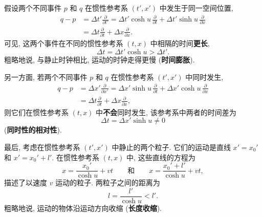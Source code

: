 假设两个不同事件 $p$ 和 $q$ 在惯性参考系 $(t',x')$ 中发生于同一空间位置,
\begin{align*}
  q-p&=\Delta t'\frac{\partial}{\partial t'}
      =\Delta t'\cosh u\,\frac{\partial}{\partial t}
        +\Delta t'\sinh u\,\frac{\partial}{\partial x}\\
     &=\Delta t\frac{\partial}{\partial t}+\Delta x\frac{\partial}{\partial x}.
\end{align*}
可见, 这两个事件在不同的惯性参考系 $(t,x)$ 中相隔的时间\textbf{更长},
\[
  \Delta t=\Delta t'\cosh u>\Delta t'.
\]
粗略地说, 与静止时钟相比, 运动的时钟走得更慢 (\textbf{时间膨胀}).

另一方面, 若两个不同事件 $p$ 和 $q$ 在惯性参考系 $(t',x')$ 中同时发生,
\begin{align*}
  q-p&=\Delta x'\frac{\partial}{\partial x'}
      =\Delta x'\sinh u\,\frac{\partial}{\partial t}
        +\Delta x'\cosh u\,\frac{\partial}{\partial x}\\
     &=\Delta t\frac{\partial}{\partial t}+\Delta x\frac{\partial}{\partial x},
\end{align*}
则它们在惯性参考系 $(t,x)$ 中\textbf{不会}同时发生, 该参考系中两者的时间差为
\[
  \Delta t=\Delta x'\sinh u\ne0
\]
(\textbf{同时性的相对性}).

最后, 考虑在惯性参考系 $(t',x')$ 中静止的两个粒子. 它们的运动是直线 $x'=x_0'$ 和 $x'=x_0'+l'$. 在惯性参考系 $(t,x)$ 中, 这些直线的方程为
\[
  x=\frac{x_0'}{\cosh u}+vt
  \qquad\text{和}\qquad
  x=\frac{x_0'+l'}{\cosh u}+vt,
\]
描述了以速度 $v$ 运动的粒子. 两粒子之间的距离为
\[
  l=\frac{l'}{\cosh u}<l'.
\]
粗略地说, 运动的物体沿运动方向收缩 (\textbf{长度收缩}).

